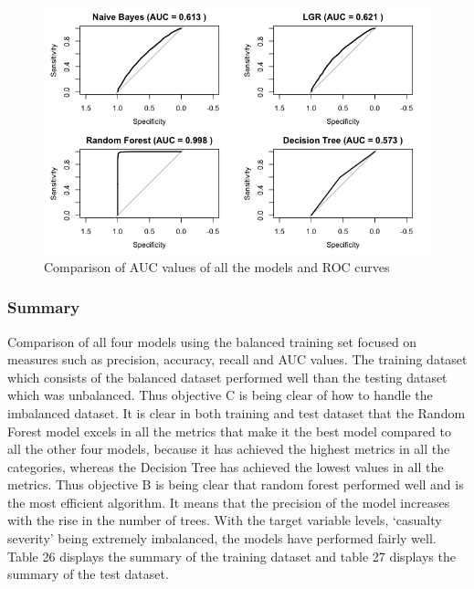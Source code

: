 \documentclass[
  a4paper,
]{article}
\begin{document}
\begin{figure}[h!]

{\centering \includegraphics[width=0.75\linewidth]{roc} 

}

\caption{Comparison of  AUC values of all the models and ROC curves}\label{fig:unnamed-chunk-20}
\end{figure}

\newpage

\hypertarget{summary}{%
\subsubsection{Summary}\label{summary}}

Comparison of all four models using the balanced training set focused on
measures such as precision, accuracy, recall and AUC values. The
training dataset which consists of the balanced dataset performed well
than the testing dataset which was unbalanced. Thus objective C is being
clear of how to handle the imbalanced dataset. It is clear in both
training and test dataset that the Random Forest model excels in all the
metrics that make it the best model compared to all the other four
models, because it has achieved the highest metrics in all the
categories, whereas the Decision Tree has achieved the lowest values in
all the metrics. Thus objective B is being clear that random forest
performed well and is the most efficient algorithm. It means that the
precision of the model increases with the rise in the number of trees.
With the target variable levels, `casualty severity' being extremely
imbalanced, the models have performed fairly well. Table 26 displays the
summary of the training dataset and table 27 displays the summary of the
test dataset.
\end{document}
